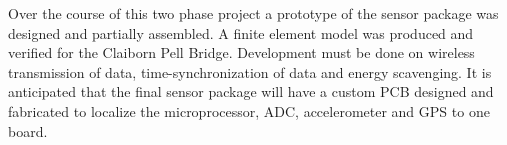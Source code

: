 
\indent Over the course of this two phase project a prototype of the sensor package was designed and partially assembled.
A finite element model was produced and verified for the Claiborn Pell Bridge.
Development must be done on wireless transmission of data, time-synchronization of data and energy scavenging.
It is anticipated that the final sensor package will have a custom PCB designed and fabricated to localize the microprocessor, ADC, accelerometer and GPS to one board.\\


